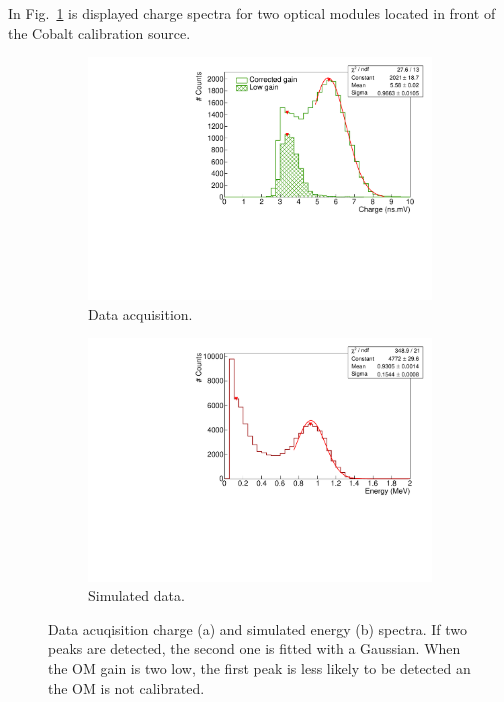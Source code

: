 In Fig.~\ref{subfig:Co_calib_charge} is displayed charge spectra for two optical modules located in front of the Cobalt calibration source.
\begin{figure}[h]
  \centering
  \begin{subfigure}[t]{0.8\textwidth}
    \centering
    \includegraphics[width=1\textwidth]{CobaltStudy/fig_CobaltStudy/ex_charge_distrib.pdf}
    \captionsetup{justification=justified}
    \caption{Data acquisition.
      \label{subfig:Co_calib_charge}}
  \end{subfigure}
  \hfill
  \begin{subfigure}[t]{0.8\textwidth}
  \centering
  \includegraphics[width=1\textwidth]{CobaltStudy/fig_CobaltStudy/ex_energy_distrib.pdf}
    \captionsetup{justification=justified}
  \caption{Simulated data.
    \label{subfig:Co_calib_energy}}
  \end{subfigure}
  \caption{Data acuqisition charge (a) and simulated energy (b) spectra.
    If two peaks are detected, the second one is fitted with a Gaussian.
    When the OM gain is two low, the first peak is less likely to be detected an the OM is not calibrated.
    \label{fig:Co_calib}}
\end{figure}
